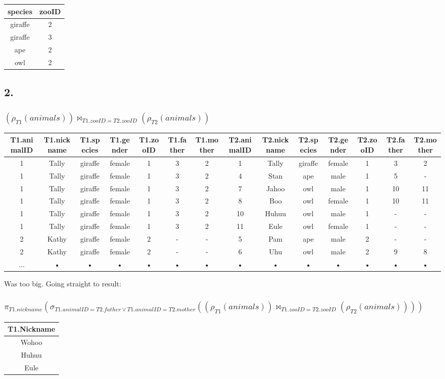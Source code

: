 \documentclass[10pt,a4paper,final]{report}
\begin{document}
\begin{tabular}{|c|c|}
\hline 
species & zooID \\ 
\hline  
giraffe & 2 \\ 
\hline 
giraffe & 3 \\
\hline 
ape & 2 \\ 
\hline 
owl & 2 \\
\hline 
\end{tabular}

\subsection*{2.}
\subsubsection*{$(\rho_{T1}(animals)) \Join_{T1.zooID = T2.zooID} (\rho_{T2}(animals))$}
\begin{tabular}{|c|c|c|c|c|c|c|c|c|c|c|c|c|c|}
\hline 
T1.animalID & T1.nickname & T1.species & T1.gender & T1.zooID & T1.father & T1.mother & T2.animalID & T2.nickname & T2.species & T2.gender & T2.zooID & T2.father & T2.mother \\ 
\hline 
1 & Tally & giraffe & female & 1 & 3 & 2 & 1 & Tally & giraffe & female & 1 & 3 & 2 \\ 
\hline 
1 & Tally & giraffe & female & 1 & 3 & 2 & 4 & Stan & ape & male & 1 & 5 & - \\ 
\hline 
1 & Tally & giraffe & female & 1 & 3 & 2 & 7 & Jahoo & owl & male & 1 & 10 & 11 \\ 
\hline 
1 & Tally & giraffe & female & 1 & 3 & 2 & 8 & Boo & owl & female & 1 & 10 & 11 \\ 
\hline 
1 & Tally & giraffe & female & 1 & 3 & 2 & 10 & Huhuu & owl & male & 1 & - & - \\ 
\hline 
1 & Tally & giraffe & female & 1 & 3 & 2 & 11 & Eule & owl & female & 1 & - & - \\ 
\hline 
2 & Kathy & giraffe & female & 2 & - & - & 5 & Pam & ape & male & 2 & - & - \\ 
\hline 
2 & Kathy & giraffe & female & 2 & - & - & 6 & Uhu & owl & male & 2 & 9 & 8 \\ 
\hline 
... & • & • & • & • & • & • & • & • & • & • & • & • & • \\ 
\hline 
\end{tabular} 
Was too big. Going straight to result:

\subsubsection*{$\pi_{T1.nickname} ( \sigma_{T1.animalID = T2.father \lor T1.animalID = T2.mother}((\rho_{T1}(animals)) \Join_{T1.zooID = T2.zooID} (\rho_{T2}(animals))))$}
\begin{tabular}{|c|}
\hline 
T1.Nickname \\ 
\hline 
Wohoo \\ 
\hline 
Huhuu \\ 
\hline 
Eule \\ 
\hline 
\end{tabular} 
\end{document}

